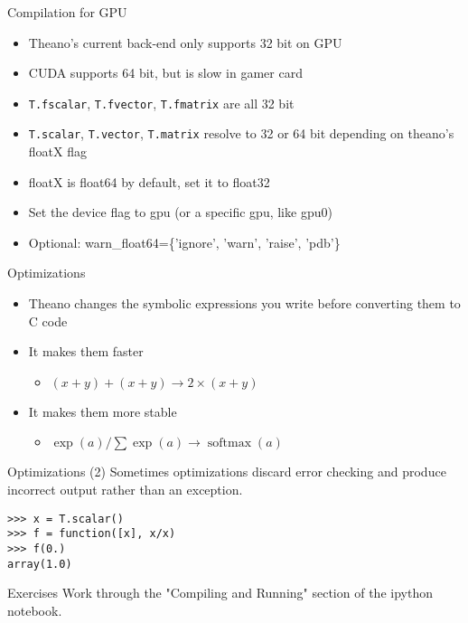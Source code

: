 \documentclass[utf8x,hyperref={pdfpagelabels=false}]{beamer}
\newcommand{\code}[1]{\lstinline[emph={[2]}]|#1|}
\begin{document}
\begin{frame}{Compilation for GPU}
  \begin{itemize}
  \item Theano's current back-end only supports 32 bit on GPU
  \item CUDA supports 64 bit, but is slow in gamer card
  \item \code{T.fscalar}, \code{T.fvector}, \code{T.fmatrix} are all 32 bit
  \item \code{T.scalar}, \code{T.vector}, \code{T.matrix} resolve to 32 or 64 bit depending on theano’s floatX flag
  \item floatX is float64 by default, set it to float32
  \item Set the device flag to gpu (or a specific gpu, like gpu0)
  \item Optional: warn\_float64=\{'ignore', 'warn', 'raise', 'pdb'\}
  \end{itemize}
\end{frame}

\begin{frame}{Optimizations}
  \begin{itemize}
  \item Theano changes the symbolic expressions
    you write before converting them to C code
  \item It makes them faster
  \begin{itemize}
  \item $(x+y)+(x+y) \to 2\times(x + y)$
  \end{itemize}
  \item It makes them more stable
  \begin{itemize}
  \item $\exp(a)/\sum{\exp(a)} \to \operatorname{softmax}(a)$
  \end{itemize}
  \end{itemize}
\end{frame}

\begin{frame}[fragile]{Optimizations (2)}
Sometimes optimizations discard error checking and produce incorrect output rather than an exception.
\begin{lstlisting}
>>> x = T.scalar()
>>> f = function([x], x/x)
>>> f(0.)
array(1.0)
\end{lstlisting}
\end{frame}

\begin{frame}{Exercises}
Work through the "Compiling and Running" section of the ipython notebook.
\end{frame}
\end{document}
